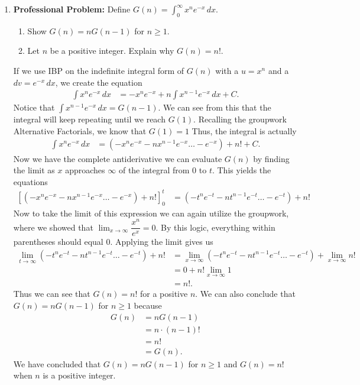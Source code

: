 \documentclass{article}
\begin{document}
\begin{enumerate}[label=\textbf{(5.\arabic*)}]

\newpage


\item \textbf{Professional Problem:} Define $G(n)=\int_0^\infty\!x^ne^{-x}\,dx$.
\begin{enumerate}
    \item Show $G(n)=nG(n-1)$ for $n\geq1$.
    \item Let $n$ be a positive integer. Explain why $G(n)=n!$.
\end{enumerate}

If we use IBP on  the indefinite integral form of $G(n)$ with a $u=x^n$ and a $dv=e^{-x}\,dx$, we create the equation
\begin{align}
        \int\!x^ne^{-x}\,dx &= -x^ne^{-x}+n\int\!x^{n-1}e^{-x}\,dx+C\mathrm{.}
    \end{align} %
Notice that $\int\!x^{n-1}e^{-x}\,dx=G(n-1)$. We can see from this that the integral will keep repeating until we reach $G(1)$. Recalling the groupwork Alternative Factorials, we know that $G(1)=1$ Thus, the integral is actually
\begin{align}
    \int\!x^ne^{-x}\,dx &= \left(-x^ne^{-x}-nx^{n-1}e^{-x}\ldots-e^{-x}\right)+n!+C\mathrm{.}
\end{align} %
Now we have the complete antiderivative we can evaluate $G(n)$ by finding the limit as $x$ approaches $\infty$ of the integral from $0$ to $t$. This yields the equations
\begin{align}
    \left[\left(-x^ne^{-x}-nx^{n-1}e^{-x}\ldots-e^{-x}\right)+n!\right]_0^t &= \left(-t^ne^{-t}-nt^{n-1}e^{-t}\ldots-e^{-t}\right)+n!
\end{align}
Now to take the limit of this expression we can again utilize the groupwork, where we showed that $\lim_{x\to\infty} \dfrac{x^n}{e^{x}}=0$. By this logic, everything within parentheses should equal $0$. Applying the limit gives us
\begin{align*}
    \lim_{t\to\infty} {\left(-t^ne^{-t}-nt^{n-1}e^{-t}\ldots-e^{-t}\right)+n!} &= \lim_{x\to\infty} {\left(-t^ne^{-t}-nt^{n-1}e^{-t}\ldots-e^{-t}\right)}+\lim_{x\to\infty} {n!} \\ 
    &= 0+n!\lim_{x\to\infty} {1} \\
    &= n!\mathrm{.}
\end{align*}
Thus we can see that $G(n)=n!$ for a positive $n$. We can also conclude that $G(n)=nG(n-1)$ for $n\geq1$ because 
\begin{align*}
    G(n) &= nG(n-1) \\
    &=n\cdot(n-1)! \\
    &=n! \\
    &= G(n)\mathrm{.}
\end{align*}
We have concluded that $G(n)=nG(n-1)$ for $n\geq1$ and $G(n)=n!$ when $n$ is a positive integer.


\end{enumerate}
\end{document}
